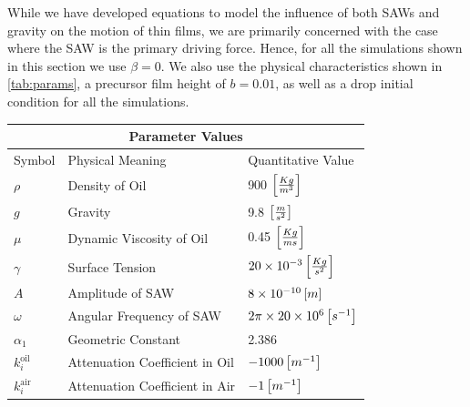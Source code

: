 While we have developed equations to model the influence of both SAWs and gravity on the 
motion of thin films, we are primarily concerned with the case where the SAW is the primary driving
force. Hence, for all the simulations shown in this section we use $\beta = 0$. We also use the 
physical characteristics shown in \cref{tab:params}, a precursor film height of $b = 0.01$, as well as a drop initial condition for all the simulations. 
 
\begin{table}[hb]
    \centering
    \begin{tabular}{|lll|}
        \hline
        \multicolumn{3}{|c|}{Parameter Values}                                                                                    \\ \hline
        \multicolumn{1}{|l|}{Symbol}             & \multicolumn{1}{l|}{Physical Meaning}                & Quantitative Value          \\ \hline
        \multicolumn{1}{|l|}{$\rho$}             & \multicolumn{1}{l|}{Density of Oil}                  & 900 $\left[ \frac{Kg}{m^3} \right]$  \\
        \multicolumn{1}{|l|}{$g$}                & \multicolumn{1}{l|}{Gravity}                         & 9.8 $\left[ \frac{m}{s^2} \right]$   \\
        \multicolumn{1}{|l|}{$\mu$}              & \multicolumn{1}{l|}{Dynamic Viscosity of Oil}        & 0.45 $\left[ \frac{Kg}{ms} \right]$                \\
        \multicolumn{1}{|l|}{$\gamma$}           & \multicolumn{1}{l|}{Surface Tension}                 & $20 \times 10^{-3} \left[ \frac{Kg}{s^2} \right]$  \\
        \multicolumn{1}{|l|}{$A$}                & \multicolumn{1}{l|}{Amplitude of SAW}                & $8 \times 10^{-10} \left[ m \right]$ \\
        \multicolumn{1}{|l|}{$\omega$}           & \multicolumn{1}{l|}{Angular Frequency of SAW}        & $2\pi \times 20 \times 10^6 \left[ s^{-1} \right]$ \\
        \multicolumn{1}{|l|}{$\alpha_1$}         & \multicolumn{1}{l|}{Geometric Constant}              & 2.386                       \\
        \multicolumn{1}{|l|}{$k_i^{\text{oil}}$} & \multicolumn{1}{l|}{Attenuation Coefficient in Oil}  & $-1000 \left[ m^{-1} \right]$                      \\
        \multicolumn{1}{|l|}{$k_i^{\text{air}}$} & \multicolumn{1}{l|}{Attenuation Coefficient in Air}  & $-1 \left[ m^{-1} \right]$                         \\

\end{tabular}
\end{table}
